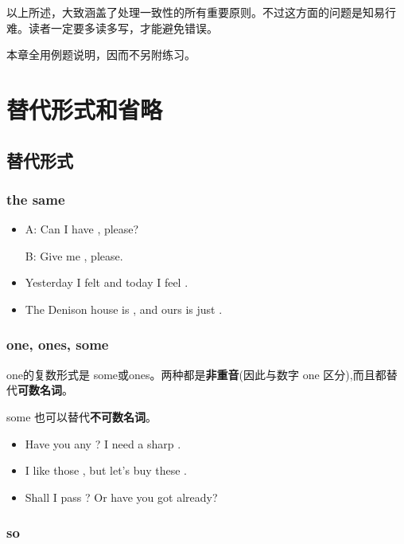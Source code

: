 以上所述，大致涵盖了处理一致性的所有重要原则。不过这方面的问题是知易行难。读者一定要多读多写，才能避免错误。

本章全用例题说明，因而不另附练习。


\chapter{替代形式和省略}

\section{替代形式}

\subsection{the same}

\begin{itemize}
\item A: Can I have , please?

  B: Give me , please.

\item Yesterday I felt  and today I feel .

\item The Denison house is , and ours is
  just .

\end{itemize}

\subsection{one, ones, some}

one的复数形式是 some或ones。两种都是\textbf{非重音}(因此与数字 one 区分),而且都替
代\textbf{可数名词}。

some 也可以替代\textbf{不可数名词}。
\begin{itemize}
\item Have you any ? I need a sharp .
\item I like those , but let's buy these .

\item Shall I pass ? Or have you got  already?
\end{itemize}


\subsection{so}

